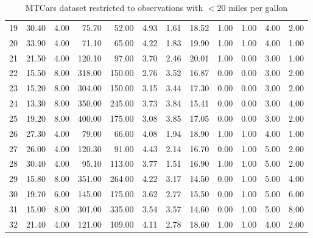 \begin{table}[ht]
\begin{tabular}{rrrrrrrrrrrr}
  19 & 30.40 & 4.00 & 75.70 & 52.00 & 4.93 & 1.61 & 18.52 & 1.00 & 1.00 & 4.00 & 2.00 \\ 
  20 & 33.90 & 4.00 & 71.10 & 65.00 & 4.22 & 1.83 & 19.90 & 1.00 & 1.00 & 4.00 & 1.00 \\ 
  21 & 21.50 & 4.00 & 120.10 & 97.00 & 3.70 & 2.46 & 20.01 & 1.00 & 0.00 & 3.00 & 1.00 \\ 
  22 & 15.50 & 8.00 & 318.00 & 150.00 & 2.76 & 3.52 & 16.87 & 0.00 & 0.00 & 3.00 & 2.00 \\ 
  23 & 15.20 & 8.00 & 304.00 & 150.00 & 3.15 & 3.44 & 17.30 & 0.00 & 0.00 & 3.00 & 2.00 \\ 
  24 & 13.30 & 8.00 & 350.00 & 245.00 & 3.73 & 3.84 & 15.41 & 0.00 & 0.00 & 3.00 & 4.00 \\ 
  25 & 19.20 & 8.00 & 400.00 & 175.00 & 3.08 & 3.85 & 17.05 & 0.00 & 0.00 & 3.00 & 2.00 \\ 
  26 & 27.30 & 4.00 & 79.00 & 66.00 & 4.08 & 1.94 & 18.90 & 1.00 & 1.00 & 4.00 & 1.00 \\ 
  27 & 26.00 & 4.00 & 120.30 & 91.00 & 4.43 & 2.14 & 16.70 & 0.00 & 1.00 & 5.00 & 2.00 \\ 
  28 & 30.40 & 4.00 & 95.10 & 113.00 & 3.77 & 1.51 & 16.90 & 1.00 & 1.00 & 5.00 & 2.00 \\ 
  29 & 15.80 & 8.00 & 351.00 & 264.00 & 4.22 & 3.17 & 14.50 & 0.00 & 1.00 & 5.00 & 4.00 \\ 
  30 & 19.70 & 6.00 & 145.00 & 175.00 & 3.62 & 2.77 & 15.50 & 0.00 & 1.00 & 5.00 & 6.00 \\ 
  31 & 15.00 & 8.00 & 301.00 & 335.00 & 3.54 & 3.57 & 14.60 & 0.00 & 1.00 & 5.00 & 8.00 \\ 
  32 & 21.40 & 4.00 & 121.00 & 109.00 & 4.11 & 2.78 & 18.60 & 1.00 & 1.00 & 4.00 & 2.00 \\ 
   \hline
\end{tabular}
\caption{MTCars dataset restricted to observations with $<20$ miles per gallon \label{tab:mtcars_full}} 
\end{table}
